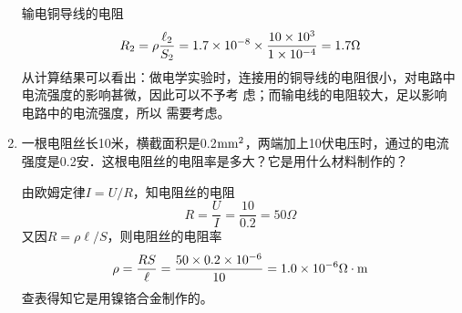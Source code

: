 \begin{enumerate}
\begin{solution}
输电铜导线的电阻
\[R_2=\rho\frac{\ell_2}{S_2}=1.7\times 10^{-8}\times \frac{10\times 10^{3}}{1\times 10^{-4}}=1.7\Omega\]
从计算结果可以看出：做电学实验时，连接用的铜导线的电阻很小，对电路中电流强度的影响甚微，因此可以不予考
虑；而输电线的电阻较大，足以影响电路中的电流强度，所以
需要考虑。
    \end{solution}
    
    \item 一根电阻丝长10米，横截面积是0.2${\rm mm}^2$，两端加上10伏电压时，通过的电流强度是0.2安．这根电阻丝的电阻率是多大？它是用什么材料制作的？

    \begin{solution}
由欧姆定律$I=U/R$，知电阻丝的电阻
\[R=\frac{U}{I}=\frac{10}{0.2}=50\Omega\]
又因$R=\rho\ell/S$，则电阻丝的电阻率
\[\rho=\frac{RS}{\ell}=\frac{50\times0.2\times10^{-6}}{10}=1.0\times 10^{-6}\Omega\cdot {\rm m}\]
查表得知它是用镍铬合金制作的。
    \end{solution}
    
\end{enumerate}



